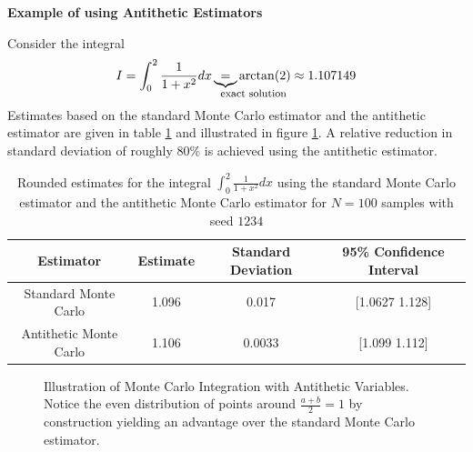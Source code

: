 \textbf{Example of using Antithetic Estimators}
\par
Consider the integral
\begin{equation}
    I = \int_{0}^{2} \frac{1}{1 + x^2} dx \explain{=}{\text{exact solution}} \arctan(2) \approx 1.107149
\end{equation}
Estimates based on the standard Monte Carlo estimator and the antithetic estimator are given in table \ref{tab:antithetic} and illustrated in figure \ref{fig:mc_antithetic}. A relative reduction in standard deviation of roughly 80\% is achieved using the antithetic estimator.

\begin{table}[!htb]
    \centering
    \begin{tabular}{|c|c|c|c|}
        \hline
        Estimator & Estimate & Standard Deviation & 95\% Confidence Interval \\
        \hline
        Standard Monte Carlo & 1.096 & 0.017 & [1.0627 1.128] \\
        Antithetic Monte Carlo & 1.106 & 0.0033 & [1.099 1.112] \\
        \hline
    \end{tabular}
    \caption{Rounded estimates for the integral $\int_{0}^{2} \frac{1}{1 + x^2} dx$ using the standard Monte Carlo estimator and the antithetic Monte Carlo estimator for $N = 100$ samples with seed $1234$}
    \label{tab:antithetic}
\end{table}

\begin{figure}[!htb]
    \centering
    \hfill
    \caption{Illustration of Monte Carlo Integration with Antithetic Variables. Notice the even distribution of points around $\frac{a+b}{2} = 1$ by construction yielding an advantage over the standard Monte Carlo estimator.}
    \label{fig:mc_antithetic}
\end{figure}



